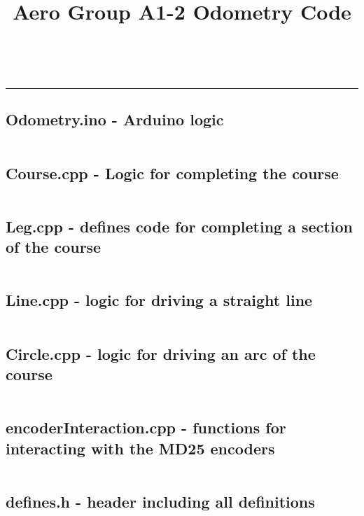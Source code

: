 \documentclass[landscape]{article}
\title{Aero Group A1-2 Odometry Code}
\makeatletter
\let\Title\@title
\makeatother
\begin{document}
    \begin{center}
        \Large \textbf{\Title} \\[0.8cm]
        \small
    \end{center}
    \hrule

    \setlength\columnsep{1cm}

    \begin{multicols}{2}

    \subsection*{Odometry.ino - Arduino logic}

    \inputminted[linenos, breaklines, fontsize=\small]{cpp}{./Odometry/Odometry.ino}

    \subsection*{Course.cpp - Logic for completing the course}

    \inputminted[linenos, breaklines, fontsize=\small]{cpp}{./Odometry/Course.cpp}

    \subsection*{Leg.cpp - defines code for completing a section of the course}

    \inputminted[linenos, breaklines, fontsize=\small]{cpp}{./Odometry/Leg.cpp}

    \subsection*{Line.cpp - logic for driving a straight line}

    \inputminted[linenos, breaklines, fontsize=\small]{cpp}{./Odometry/Line.cpp}

    \subsection*{Circle.cpp - logic for driving an arc of the course}

    \inputminted[linenos, breaklines, fontsize=\small]{cpp}{./Odometry/Circle.cpp}

    \subsection*{encoderInteraction.cpp - functions for interacting with the MD25 encoders}

    \inputminted[linenos, breaklines, fontsize=\small]{cpp}{./Odometry/encoderInteraction.cpp}

    \subsection*{defines.h - header including all definitions}

    \inputminted[linenos, breaklines, fontsize=\small]{cpp}{./Odometry/defines.h}

    \end{multicols}
    
\end{document}
